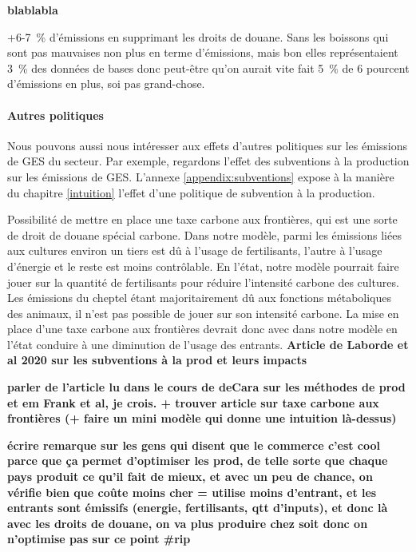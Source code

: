 \textbf{blablabla}

+6-7~\% d'émissions en supprimant les droits de douane. Sans les boissons qui sont pas mauvaises non plus en terme d'émissions, mais bon elles représentaient 3~\% des données de bases donc peut-être qu'on aurait vite fait 5~\% de 6 pourcent d'émissions en plus, soi pas grand-chose.


\paragraph{Autres politiques}\label{Sec_subvention}
Nous pouvons aussi nous intéresser aux effets d'autres politiques sur les émissions de GES du secteur. Par exemple, regardons l'effet des subventions à la production sur les émissions de GES. L'annexe \ref{appendix:subventions} expose à la manière du chapitre \ref{intuition} l'effet d'une politique de subvention à la production.

Possibilité de mettre en place une taxe carbone aux frontières, qui est une sorte de droit de douane spécial carbone. Dans notre modèle, parmi les émissions liées aux cultures environ un tiers est dû à l'usage de fertilisants, l'autre à l'usage d'énergie et le reste est moins contrôlable. En l'état, notre modèle pourrait faire jouer sur la quantité de fertilisants pour réduire l'intensité carbone des cultures. Les émissions du cheptel étant majoritairement dû aux fonctions métaboliques des animaux, il n'est pas possible de jouer sur son intensité carbone. La mise en place d'une taxe carbone aux frontières devrait donc avec dans notre modèle en l'état conduire à une diminution de l'usage des entrants. \textbf{ Article de Laborde et al 2020 sur les subventions à la prod et leurs impacts}

\textbf{parler de l'article lu dans le cours de deCara sur les méthodes de prod et em Frank et al, je crois. + trouver article sur taxe carbone aux frontières (+ faire un mini modèle qui donne une intuition là-dessus)}


\textbf{écrire remarque sur les gens qui disent que le commerce c'est cool parce que ça permet d'optimiser les prod, de telle sorte que chaque pays produit ce qu'il fait de mieux, et avec un peu de chance, on vérifie bien que coûte moins cher = utilise moins d'entrant, et les entrants sont émissifs (energie, fertilisants, qtt d'inputs), et donc là avec les droits de douane, on va plus produire chez soit donc on n'optimise pas sur ce point \#rip}